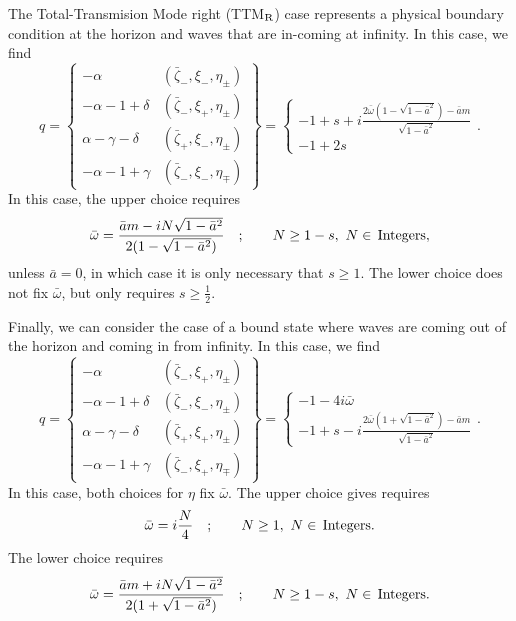 \documentclass[11pt]{article}
\begin{document}
The Total-Transmision Mode right (TTM${}_{\rm{R}}$) case represents
a physical boundary condition at the horizon and waves that are
in-coming at infinity.  In this case, we find
\begin{equation}\label{eq:PN_boundary_set}
  q= \left\{\begin{array}{cc}
            -\alpha & (\bar\zeta_\minus,\xi_\minus,\eta_\pm) \\
            -\alpha-1+\delta & (\bar\zeta_\minus,\xi_+,\eta_\pm) \\
            \alpha-\gamma-\delta & (\bar\zeta_+,\xi_\minus,\eta_\pm) \\
            -\alpha-1+\gamma & (\bar\zeta_\minus,\xi_\minus,\eta_\mp)
  \end{array}\right\} =\left\{\begin{array}{c}
  -1+s+i\frac{2\bar\omega(1-\sqrt{1-\bar{a}^2})-\bar{a}m}{\sqrt{1-\bar{a}^2}} \\
  -1+2s
  \end{array}\right. .
\end{equation}  
In this case, the upper choice requires
\begin{equation}
  \bar\omega = \frac{\bar{a}m-iN\sqrt{1-\bar{a}^2}}{2(1-\sqrt{1-\bar{a}^2})}
  \quad;\qquad N\ge 1-s,\ N\in\,\rm{Integers},
\end{equation}
unless $\bar{a}=0$, in which case it is only necessary that
$s\ge1$. The lower choice does not fix $\bar\omega$, but only requires
$s\ge\frac12$.

Finally, we can consider the case of a bound state where waves are
coming out of the horizon and coming in from infinity.  In this case,
we find
\begin{equation}\label{eq:NN_boundary_set}
  q= \left\{\begin{array}{cc}
            -\alpha & (\bar\zeta_\minus,\xi_+,\eta_\pm) \\
            -\alpha-1+\delta & (\bar\zeta_\minus,\xi_\minus,\eta_\pm) \\
            \alpha-\gamma-\delta & (\bar\zeta_+,\xi_+,\eta_\pm) \\
            -\alpha-1+\gamma & (\bar\zeta_\minus,\xi_+,\eta_\mp)
  \end{array}\right\} =\left\{\begin{array}{c}
  -1-4i\bar\omega \\
  -1+s-i\frac{2\bar\omega(1+\sqrt{1-\bar{a}^2})-\bar{a}m}{\sqrt{1-\bar{a}^2}}
  \end{array}\right. .
\end{equation} 
In this case, both choices for $\eta$ fix $\bar\omega$.  The upper
choice gives requires
\begin{equation}
  \bar\omega = i\frac{N}4 \quad;\qquad N\ge 1,\ N\in\,\rm{Integers}.
\end{equation} 
The lower choice requires
\begin{equation}
  \bar\omega = \frac{\bar{a}m+iN\sqrt{1-\bar{a}^2}}{2(1+\sqrt{1-\bar{a}^2})}
  \quad;\qquad N\ge 1-s,\ N\in\,\rm{Integers}.
\end{equation}
\end{document}
